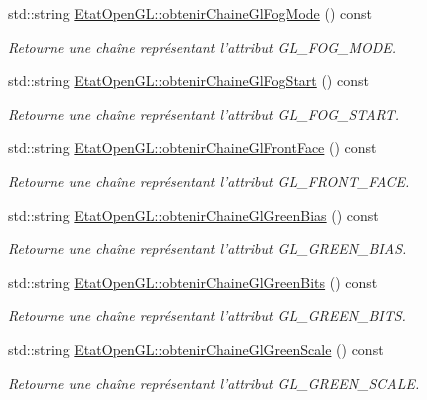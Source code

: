\begin{DoxyCompactItemize}
std\-::string \hyperlink{group__utilitaire_ga1f28b3ec34f9bd4a2080e1252ca64d57}{Etat\-Open\-G\-L\-::obtenir\-Chaine\-Gl\-Fog\-Mode} () const 
\begin{DoxyCompactList}\small\item\em Retourne une chaîne représentant l'attribut G\-L\-\_\-\-F\-O\-G\-\_\-\-M\-O\-D\-E. \end{DoxyCompactList}\item 
std\-::string \hyperlink{group__utilitaire_ga7063764912254ec440429aee9e8c3f83}{Etat\-Open\-G\-L\-::obtenir\-Chaine\-Gl\-Fog\-Start} () const 
\begin{DoxyCompactList}\small\item\em Retourne une chaîne représentant l'attribut G\-L\-\_\-\-F\-O\-G\-\_\-\-S\-T\-A\-R\-T. \end{DoxyCompactList}\item 
std\-::string \hyperlink{group__utilitaire_ga5843f630d530a2112407e19b540e3c42}{Etat\-Open\-G\-L\-::obtenir\-Chaine\-Gl\-Front\-Face} () const 
\begin{DoxyCompactList}\small\item\em Retourne une chaîne représentant l'attribut G\-L\-\_\-\-F\-R\-O\-N\-T\-\_\-\-F\-A\-C\-E. \end{DoxyCompactList}\item 
std\-::string \hyperlink{group__utilitaire_gabb435ce9e5ba38406d8c429a5a0510ed}{Etat\-Open\-G\-L\-::obtenir\-Chaine\-Gl\-Green\-Bias} () const 
\begin{DoxyCompactList}\small\item\em Retourne une chaîne représentant l'attribut G\-L\-\_\-\-G\-R\-E\-E\-N\-\_\-\-B\-I\-A\-S. \end{DoxyCompactList}\item 
std\-::string \hyperlink{group__utilitaire_ga418e82a0a01a9dfe598780e602b41b2f}{Etat\-Open\-G\-L\-::obtenir\-Chaine\-Gl\-Green\-Bits} () const 
\begin{DoxyCompactList}\small\item\em Retourne une chaîne représentant l'attribut G\-L\-\_\-\-G\-R\-E\-E\-N\-\_\-\-B\-I\-T\-S. \end{DoxyCompactList}\item 
std\-::string \hyperlink{group__utilitaire_ga933583938ec361ea302f25dd1323b541}{Etat\-Open\-G\-L\-::obtenir\-Chaine\-Gl\-Green\-Scale} () const 
\begin{DoxyCompactList}\small\item\em Retourne une chaîne représentant l'attribut G\-L\-\_\-\-G\-R\-E\-E\-N\-\_\-\-S\-C\-A\-L\-E. \end{DoxyCompactList}\item 

\end{DoxyCompactItemize}

